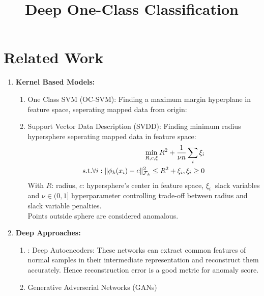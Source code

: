 \documentclass[a4]{article}
\title{Deep One-Class Classification}
\author{}
\begin{document}
\maketitle


\section{Related Work}
\begin{enumerate}
\item \textbf{Kernel Based Models:}\\
\begin{enumerate}
\item One Class SVM (OC-SVM): Finding a maximum margin hyperplane in feature space, seperating mapped data from origin:

\item Support Vector Data Description (SVDD): Finding minimum radius hypersphere seperating mapped data in feature space:
\begin{equation}
\begin{split}
\min_{R, c, \xi} R^2 + \frac{1}{\nu n}\sum_i \xi_i\\
\textup{s.t.} \forall i : \Vert\phi_k(x_i) - c\Vert ^2 _{\mathcal{F}_k} \leq R^2 + \xi_i, \xi_i \geq 0
\end{split}
\end{equation}
With $R$: radius, $c$: hypersphere's center in feature space, $ \xi_i \ $ slack variables and $ \nu \in (0, 1] $ hyperparameter controlling trade-off between radius and slack variable penalties.\\
Points outside sphere are considered anomalous.

\end{enumerate}
\item \textbf{Deep Approaches:}\\
\begin{enumerate}
\item: Deep Autoencoders: These networks can extract common features of normal samples in their intermediate representation and reconstruct them accurately. Hence reconstruction error is a good metric for anomaly score.
\item Generative Adverserial Networks (GANs)
\end{enumerate}
\end{enumerate}
\end{document}
